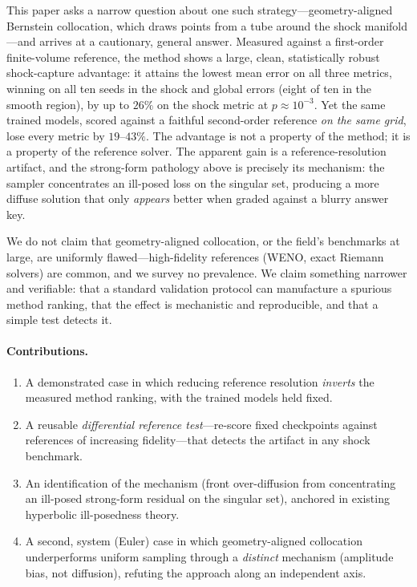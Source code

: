\documentclass[11pt]{article}
\begin{document}
This paper asks a narrow question about one such strategy---geometry-aligned
Bernstein collocation, which draws points from a tube around the shock
manifold---and arrives at a cautionary, general answer. Measured against a
first-order finite-volume reference, the method shows a large, clean,
statistically robust shock-capture advantage: it attains the lowest mean error on
all three metrics, winning on all ten seeds in the shock and global errors (eight
of ten in the smooth region), by up to $26\%$ on the shock metric at
$p\approx10^{-3}$. Yet the same trained models, scored
against a faithful second-order reference \emph{on the same grid}, lose every
metric by $19$--$43\%$. The advantage is not a property of the method; it is a
property of the reference solver. The apparent gain is a reference-resolution
artifact, and the strong-form pathology above is precisely its mechanism: the
sampler concentrates an ill-posed loss on the singular set, producing a more
diffuse solution that only \emph{appears} better when graded against a blurry
answer key.

We do not claim that geometry-aligned collocation, or the field's benchmarks at
large, are uniformly flawed---high-fidelity references (WENO, exact Riemann
solvers) are common, and we survey no prevalence. We claim something narrower and
verifiable: that a standard validation protocol can manufacture a spurious method
ranking, that the effect is mechanistic and reproducible, and that a simple test
detects it.
\paragraph{Contributions.}
\begin{enumerate}
  \item A demonstrated case in which reducing reference resolution \emph{inverts} the measured method ranking, with the trained models held fixed.
  \item A reusable \emph{differential reference test}---re-score fixed checkpoints against references of increasing fidelity---that detects the artifact in any shock benchmark.
  \item An identification of the mechanism (front over-diffusion from concentrating an ill-posed strong-form residual on the singular set), anchored in existing hyperbolic ill-posedness theory.
  \item A second, system (Euler) case in which geometry-aligned collocation underperforms uniform sampling through a \emph{distinct} mechanism (amplitude bias, not diffusion), refuting the approach along an independent axis.
\end{enumerate}
\end{document}
